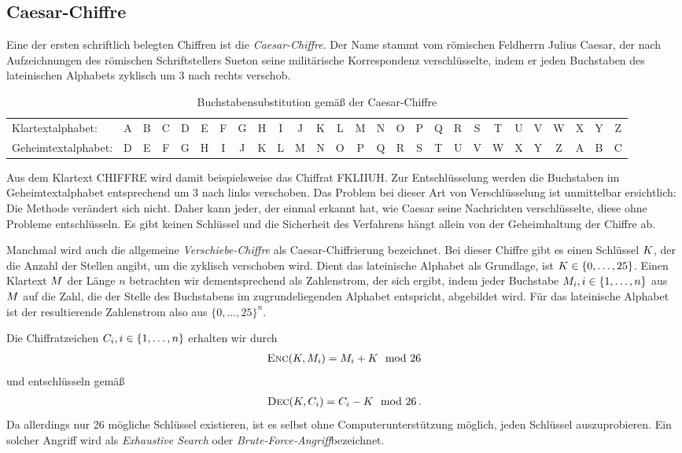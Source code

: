\subsection{Caesar-Chiffre}
Eine der ersten schriftlich belegten Chiffren ist die
\emph{Caesar-Chiffre}\indexCaesar. Der Name stammt vom römischen
Feldherrn Julius Caesar, der nach Aufzeichnungen des römischen
Schriftstellers Sueton seine militärische Korrespondenz verschlüsselte,
indem er jeden Buchstaben des lateinischen Alphabets zyklisch um 3 nach
rechts verschob. 
\begin{table}[h]
	\centering
	\setlength{\tabcolsep}{2pt}
	\begin{tabular}{l*{26}{c}}
		Klartextalphabet: &A&B&C&D&E&F&G&H&I&J&K&L&M&N&O&P&Q&R&S&T&U&V&W&X&Y&Z\\
		Geheimtextalphabet: &D&E&F&G&H&I&J&K&L&M&N&O&P&Q&R&S&T&U&V&W&X&Y&Z&A&B&C\\
	\end{tabular}
	\caption{Buchstabensubstitution gemäß der Caesar-Chiffre}
\end{table}

Aus dem Klartext \glqq CHIFFRE\grqq{} wird damit beispielsweise das
Chiffrat \glqq FKLIIUH\grqq. Zur Entschlüsselung werden die Buchstaben
im Geheimtextalphabet entsprechend um 3 nach links verschoben. Das
Problem bei dieser Art von Verschlüsselung ist unmittelbar ersichtlich:
Die Methode verändert sich nicht. Daher kann jeder, der einmal erkannt
hat, wie Caesar seine Nachrichten verschlüsselte, diese ohne Probleme
entschlüsseln. Es gibt keinen Schlüssel und die Sicherheit des
Verfahrens hängt allein von der Geheimhaltung der Chiffre ab. 

Manchmal wird auch die allgemeine \emph{Verschiebe-Chiffre} als
Caesar-Chiffrierung bezeichnet. Bei dieser Chiffre gibt es einen
Schlüssel $K$, der die Anzahl der Stellen angibt, um die zyklisch
verschoben wird. Dient das lateinische Alphabet als Grundlage, ist $K
\in \{0,\dots,25\}$. Einen Klartext $M$ der Länge $n$ betrachten
wir dementsprechend als Zahlenstrom, der sich ergibt, indem jeder
Buchstabe $M_{i}, i \in \{1,\dots,n\}$ aus $M$ auf die Zahl,
die der Stelle des Buchstabens im zugrundeliegenden Alphabet entspricht,
abgebildet wird. Für das lateinische Alphabet ist der resultierende
Zahlenstrom also aus $\{0,\dots,25\}^{n}$.

Die Chiffratzeichen $C_{i}, i \in \{1,\dots,n\}$ erhalten wir durch 
\begin{align*}
  \textsc{Enc}(K, M_i) = M_i + K \mod 26
\end{align*}
und entschlüsseln gemäß
\begin{align*}
  \textsc{Dec}(K, C_i) = C_i - K \mod 26\, .
\end{align*}
Da allerdings nur 26 mögliche Schlüssel existieren, ist es selbst ohne
Computerunterstützung möglich, jeden Schlüssel auszuprobieren. Ein
solcher Angriff wird als \emph{Exhaustive Search} oder
\emph{Brute-Force-Angriff}\indexBruteForce bezeichnet. 

